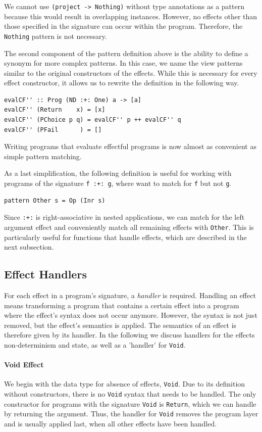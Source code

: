 \documentclass[a4paper, 11pt, fleqn, twoside]{scrreprt}
\newcommand{\hinl}[1]{\texttt{#1}}
\begin{document}
We cannot use \hinl{(project -> Nothing)} without type annotations as a pattern because this would result in overlapping instances.
However, no effects other than those specified in the signature can occur within the program.
Therefore, the \hinl{Nothing} pattern is not necessary.

The second component of the pattern definition above is the ability to define a synonym for more complex patterns.
In this case, we name the view patterns similar to the original constructors of the effects.
While this is necessary for every effect constructor, it allows us to rewrite the definition in the following way.

\begin{verbatim}
evalCF'' :: Prog (ND :+: One) a -> [a]
evalCF'' (Return    x) = [x]
evalCF'' (PChoice p q) = evalCF'' p ++ evalCF'' q
evalCF'' (PFail      ) = []
\end{verbatim}

Writing programs that evaluate effectful programs is now almost as convenient as simple pattern matching.

As a last simplification, the following definition is useful for working with programs of the signature \hinl{f :+: g}, where want to match for \hinl{f} but not \hinl{g}.

\begin{verbatim}
pattern Other s = Op (Inr s)
\end{verbatim}

Since \hinl{:+:} is right-associative in nested applications, we can match for the left argument effect and conveniently match all remaining effects with \hinl{Other}.
This is particularly useful for functions that handle effects, which are described in the next subsection.


\subsection{Effect Handlers}
\label{subsec:effectHandlers}
For each effect in a program's signature, a \textit{handler} is required.
Handling an effect means transforming a program that contains a certain effect into a program where the effect's syntax does not occur anymore.
However, the syntax is not just removed, but the effect's semantics is applied.
The semantics of an effect is therefore given by its handler.
In the following we discuss handlers for the effects non-determinism and state, as well as a 'handler' for \hinl{Void}.

\paragraph{Void Effect}
We begin with the data type for absence of effects, \hinl{Void}.
Due to its definition without constructors, there is no \hinl{Void} syntax that needs to be handled.
The only constructor for programs with the signature \hinl{Void} is \hinl{Return}, which we can handle by returning the argument.
Thus, the handler for \hinl{Void} removes the program layer and is usually applied last, when all other effects have been handled.
\end{document}
